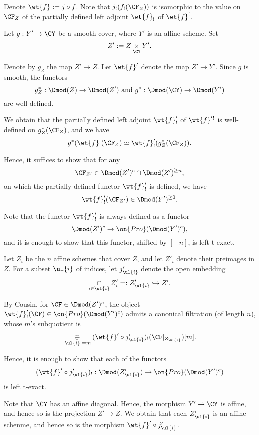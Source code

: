 \documentclass[9pt]{amsart}
\theoremstyle{remark}
\theoremstyle{definition}
\theoremstyle{remark}
\numberwithin{equation}{section}
\begin{document}
\sssec{}

Denote $\wt{f}:=j\circ f$. Note that $j_!(f_!(\CF_Z))$ is isomorphic to the value on $\CF_Z$ of the partially defined
left adjoint $\wt{f}_!$ of $\wt{f}^!$. 

\medskip

Let $g:Y'\to \CY$ be a smooth cover, where $Y'$ is an affine scheme. Set
$$Z':=Z\underset{\CY}\times Y'.$$

\medskip

Denote by $g_Z$ the map $Z'\to Z$. Let $\wt{f}'$ denote the map $Z'\to Y'$. 
Since $g$ is smooth, the functors
$$g_Z^*:\Dmod(Z)\to \Dmod(Z') \text{ and } g^*:\Dmod(\CY)\to \Dmod(Y')$$
are well defined. 

\medskip

We obtain that the partially defined left adjoint $\wt{f}'_!$
of $\wt{f}'{}^!$ is well-defined on $g_Z^*(\CF_Z)$, and we have
$$g^*(\wt{f}_!(\CF_Z) \simeq \wt{f}'_!(g_Z^*(\CF_Z)).$$

\medskip

Hence, it suffices to show that for any 
$$\CF_{Z'}\in \Dmod(Z')^c\cap \Dmod(Z')^{\geq n},$$
on which the partially defined functor $\wt{f}'_!$ is defined, we have
$$\wt{f}'_!(\CF_{Z'})\in \Dmod(Y')^{\geq 0}.$$

\sssec{}

Note that the functor $\wt{f}'_!$ is always defined as a functor
$$\Dmod(Z')^c\to \on{Pro}(\Dmod(Y')^c),$$
and it is enough to show that this functor, shifted by $[-n]$, is left t-exact. 

\medskip

Let $Z_i$ be the $n$ affine schemes that cover $Z$, and let $Z'_i$ denote their preimages
in $Z$. For a subset $\ul{i}$ of indices, let $j'_{\ul{i}}$ denote the open embedding
$$\underset{i\in \ul{i}}\cap\, Z'_i=:Z'_{\ul{i}}\hookrightarrow Z'.$$

\medskip

By Cousin, for $\CF\in \Dmod(Z')^c$, the object $\wt{f}'_!(\CF)\in \on{Pro}(\Dmod(Y')^c)$ 
admits a canonical filtration (of length $n$), whose $m$'s subquotient is
$$\underset{|\ul{i}|=m}\oplus\, (\wt{f}'\circ j'_{\ul{i}})_!(\CF|_{Z_{\ul{i}}})[m].$$

Hence, it is enough to show that each of the functors
$$(\wt{f}'\circ j'_{\ul{i}})_!:\Dmod(Z'_{\ul{i}})\to \on{Pro}(\Dmod(Y')^c)$$
is left t-exact.

\sssec{}

Note that $\CY$ has an affine diagonal. Hence, the morphism $Y'\to \CY$ is affine,
and hence so is the projection $Z'\to Z$. We obtain that each $Z'_{\ul{i}}$ is an affine schenme,
and hence so is the morphism $\wt{f}'\circ j'_{\ul{i}}$. 
\end{document}
